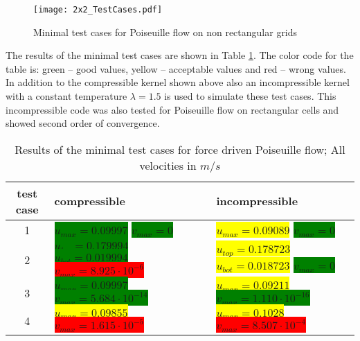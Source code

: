 \documentclass[
	pdftex,             %
	12pt,				%
	a4paper,		   	%
	english,				%
	oneside,			%
]{article}
\begin{document}
\begin{figure}[h!]
\center
\texttt{[image: 2x2\_TestCases.pdf]}
\caption{Minimal test cases for Poiseuille flow on non rectangular grids}
\label{fig:Poseieuille2x2_Mesh}
\end{figure}

The results of the minimal test cases are shown in Table \ref{tab:resultsMinimal}.
The color code for the table is: green -- good values, yellow -- acceptable values and red -- wrong values.
In addition to the compressible kernel shown above also an incompressible kernel with a constant temperature $\lambda = 1.5$ is used to simulate these test cases.
This incompressible code was also tested for Poiseuille flow on rectangular cells and showed second order of convergence.

\begin{table}
\centering
\def\arraystretch{1.5}
\setlength\tabcolsep{5mm}
\begin{tabular}{|c|p{4cm}|p{4cm}|}
    \hline
    test case & compressible & incompressible \\ \hline
    1 & \colorbox{green}{$u_{max} = 0.09997$} \newline
        \colorbox{green}{$v_{max} = 0$} 
      & \colorbox{yellow}{$u_{max} = 0.09089$} \newline
        \colorbox{green}{$v_{max} = 0$}  
      \\ \hline
    2 & \colorbox{green}{$u_{top} = 0.179994$} \newline
        \colorbox{green}{$u_{bot} = 0.019994$} \newline
        \colorbox{red}{$v_{max} = 8.925 \cdot 10^{-6}$} 
      & \colorbox{yellow}{$u_{top} = 0.178723$} \newline
        \colorbox{yellow}{$u_{bot} = 0.018723$} \newline
        \colorbox{green}{$v_{max} = 0$} 
      \\ \hline
    3 & \colorbox{green}{$u_{max} = 0.09997$} \newline
        \colorbox{green}{$v_{max} = 5.684 \cdot 10^{-14}$}
      & \colorbox{yellow}{$u_{max} = 0.09211$} \newline
        \colorbox{green}{$v_{max} = 1.110 \cdot 10^{-16}$}
      \\ \hline
    4 & \colorbox{yellow}{$u_{max} = 0.09855$} \newline
        \colorbox{red}{$v_{max} = 1.615 \cdot 10^{-5}$} 
      & \colorbox{yellow}{$u_{max} = 0.1028$} \newline
        \colorbox{red}{$v_{max} = 8.507 \cdot 10^{-4}$} 
      \\ \hline
\end{tabular}
\caption{Results of the minimal test cases for force driven Poiseuille flow; All velocities in $m/s$}
\label{tab:resultsMinimal}
\end{table}
\end{document}
